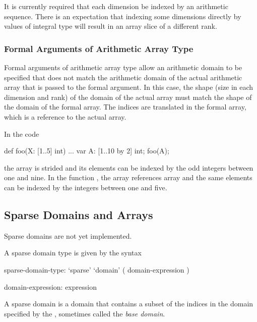 \begin{status}
It is currently required that each dimension be indexed by an
arithmetic sequence.  There is an expectation that indexing some
dimensions directly by values of integral type will result in an array
slice of a different rank.
\end{status}

\subsubsection{Formal Arguments of Arithmetic Array Type}
\label{Formal_Arguments_of_Arithmetic_Array_Type}

Formal arguments of arithmetic array type allow an arithmetic domain
to be specified that does not match the arithmetic domain of the
actual arithmetic array that is passed to the formal argument.  In
this case, the shape (size in each dimension and rank) of the domain
of the actual array must match the shape of the domain of the formal
array.  The indices are translated in the formal array, which is a
reference to the actual array.

\begin{example}
In the code
\begin{chapel}
def foo(X: [1..5] int) { ... }
var A: [1..10 by 2] int;
foo(A);
\end{chapel}
the array  is strided and its elements can be indexed by the
odd integers between one and nine.  In the function , the
array  references array  and the same elements can be
indexed by the integers between one and five.
\end{example}

\subsection{Sparse Domains and Arrays}
\label{Sparse_Domains_and_Arrays}

\begin{status}
Sparse domains are not yet implemented.
\end{status}

A sparse domain type is given by the syntax
\begin{syntax}
sparse-domain-type:
  `sparse' `domain' ( domain-expression )

domain-expression:
  expression
\end{syntax}
A sparse domain is a domain that contains a subset of the indices in
the domain specified by the , sometimes called
the {\em base domain}.

